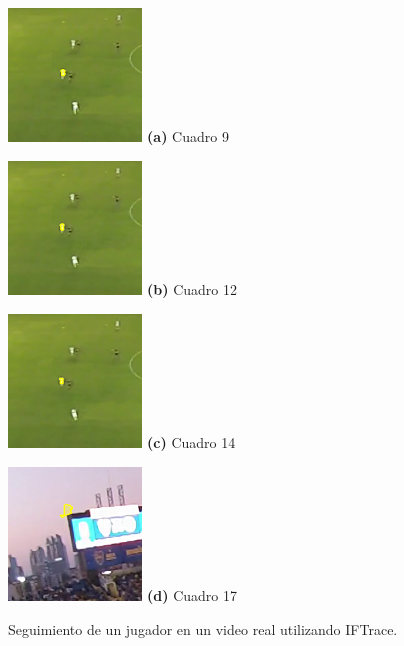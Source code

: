 \begin{figure}[H]
    \centering
    \begin{minipage}[t]{.25\textwidth}
      \includegraphics[width=1.4in]{./images/cropped_boca_00009.png}
      \centering
      \footnotesize
      \textbf{(a)} Cuadro 9
    \end{minipage}
    \hspace{-0.3cm}
    \begin{minipage}[t]{.25\textwidth}
      \includegraphics[width=1.4in]{./images/cropped_boca_00012.png}
      \centering
      \footnotesize
      \textbf{(b)} Cuadro 12
    \end{minipage}
    \hspace{-0.3cm}
    \begin{minipage}[t]{.25\textwidth}
      \includegraphics[width=1.4in]{./images/cropped_boca_00014.png}
      \centering
      \footnotesize
      \textbf{(c)} Cuadro 14
    \end{minipage}
    \hspace{-0.3cm}
    \begin{minipage}[t]{.25\textwidth}
      \includegraphics[width=1.4in]{./images/cropped_boca_00017.png}
      \centering
      \footnotesize
      \textbf{(d)} Cuadro 17
    \end{minipage}
    \caption{Seguimiento de un jugador en un video real utilizando IFTrace.
    \label{fig:boca-iftrace}
    }
\end{figure}

